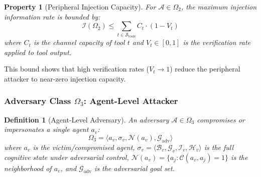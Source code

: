 \documentclass[
]{article}
\newtheorem{definition}{Definition}[section]
\newtheorem{property}{Property}[section]
\begin{document}
\begin{property}[Peripheral Injection Capacity]
\label{prop:omega2-injection}
For $\mathcal{A} \in \Omega_2$, the maximum injection information rate is bounded by:
\begin{equation}
\label{eq:omega2-rate}
\mathcal{I}(\Omega_2) \leq \sum_{t \in \mathcal{S}_{\text{tools}}} C_t \cdot (1 - V_t)
\end{equation}
where $C_t$ is the channel capacity of tool $t$ and $V_t \in [0,1]$ is the verification rate applied to tool output.
\end{property}

This bound shows that high verification rates (\(V_t \to 1\)) reduce the
peripheral attacker to near-zero injection capacity.

\subsubsection{\texorpdfstring{Adversary Class \(\Omega_3\): Agent-Level
Attacker}{Adversary Class Omega_3: Agent-Level Attacker}}\label{adversary-class-omega_3-agent-level-attacker}

\begin{definition}[Agent-Level Adversary]
\label{def:omega3}
An adversary $\mathcal{A} \in \Omega_3$ compromises or impersonates a single agent $a_v$:
\begin{equation}
\label{eq:omega3-formal}
\Omega_3 = \langle a_v, \sigma_v, \mathcal{N}(a_v), \mathcal{G}_{\text{adv}} \rangle
\end{equation}
where $a_v$ is the victim/compromised agent, $\sigma_v = \langle \mathcal{B}_v, \mathcal{G}_v, \mathcal{I}_v, \mathcal{H}_v \rangle$ is the full cognitive state under adversarial control, $\mathcal{N}(a_v) = \{a_j : \mathcal{C}(a_v, a_j) = 1\}$ is the neighborhood of $a_v$, and $\mathcal{G}_{\text{adv}}$ is the adversarial goal set.
\end{definition}
\end{document}
